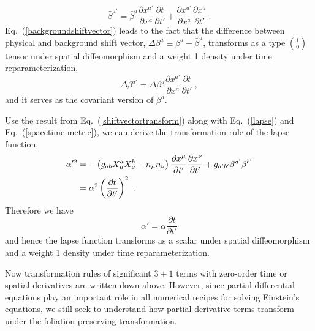 \begin{equation}\label{backgroundshiftvector}
{\bar \beta}^{a'} = {\bar \beta}^{a}\frac{\partial x^{a'}}{\partial x^{a}}\frac{\partial t}{\partial t'} + \frac{\partial x^{a'}}{\partial x^{a}}\frac{\partial x^{a}}{\partial t'} \ .
\end{equation}
Eq.~(\ref{backgroundshiftvector}) leads to the fact that the difference between physical and background shift vector, $\Delta \beta^{a} \equiv \beta^{a} - {\bar \beta}^{a}$, transforms as a type $1 \choose 0$ tensor under spatial diffeomorphism and a weight 1 density under time reparameterization, 
\begin{equation}\label{covariantshiftvector}
	\Delta \beta^{a'} = \Delta \beta^{a}\frac{\partial x^{a'}}{\partial x^{a}}\frac{\partial t}{\partial t'} \ ,
\end{equation}
and it serves as the covariant version of $\beta^{a}$. 

Use the result from Eq.~(\ref{shiftvectortransform}) along with Eq.~(\ref{lapse}) and Eq.~(\ref{spacetime metric}), we can derive the transformation rule of the lapse function, 
\begin{align*}
\alpha'^{2} & = - \left(g_{ab}X^{a}_{\mu}X^{b}_{\nu} - n_{\mu}n_{\nu}\right)\frac{\partial x^{\mu}}{\partial t'}\frac{\partial x^{\nu}}{\partial t'} + g_{a'b'}\beta^{a'}\beta^{b'}\notag\\ 
& = \alpha^2\left(\frac{\partial t}{\partial t'}\right)^{2} \ .
\end{align*}
Therefore we have
\begin{equation}\label{lapsetransform}
\alpha' = \alpha\frac{\partial t}{\partial t'}
\end{equation}
and hence the lapse function transforms as a scalar under spatial diffeomorphism and a weight 1 density under time reparameterization. 

Now transformation rules of significant $3 + 1$ terms with zero-order time or spatial derivatives are written down above. However, since partial differential equations play an important role in all numerical recipes for solving Einstein's equations, we still seek to understand how partial derivative terms transform under the foliation preserving transformation. 

